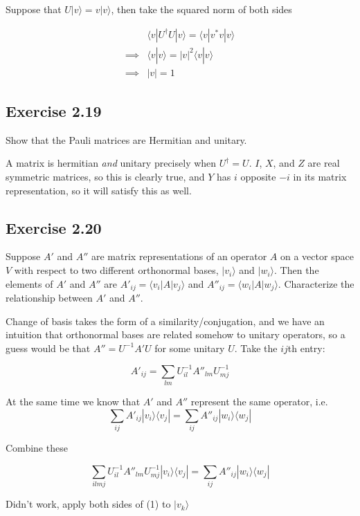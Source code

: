 \documentclass[]{article}
\newcommand{\bra}[1]{\langle #1 |}
\newcommand{\ket}[1]{| #1 \rangle}
\newcommand{\braket}[2]{\langle #1 | #2 \rangle}
\newcommand{\ord}[1]{\left| #1 \right|}
\begin{document}
Suppose that $U\ket{v} = v\ket{v}$, then take the squared norm of both sides

\begin{align*}
&\bra{v}U^\dagger U\ket{v} = \bra{v} v^*v \ket{v} \\
\implies &\braket{v}{v} = \ord{v}^2\braket{v}{v} \\
\implies &\ord{v} = 1
\end{align*}

\subsection{Exercise 2.19}
Show that the Pauli matrices are Hermitian and unitary.

A matrix is hermitian \textit{and} unitary precisely when $U^\dagger = U$. $I$, $X$, and $Z$ are real symmetric matrices, so this is clearly true, and $Y$ has $i$ opposite $-i$ in its matrix representation, so it will satisfy this as well.

\subsection{Exercise 2.20}

Suppose $A'$ and $A''$ are matrix representations of an operator $A$ on a vector space $V$ with respect to two different orthonormal bases, $\ket{v_i}$ and $\ket{w_i}$. Then the elements of $A'$ and $A''$ are $A'_{ij} = \bra{v_i}A\ket{v_j}$ and $A''_{ij} = \bra{w_i}A\ket{w_j}$. Characterize the relationship between $A'$ and $A''$.

Change of basis takes the form of a similarity/conjugation, and we have an intuition that orthonormal bases are related somehow to unitary operators, so a guess would be that $A'' = U^{-1}A'U$ for some unitary $U$. Take the $ij$th entry:

\[A'_{ij} = \sum_{lm} U^{-1}_{il}A''_{lm}U^{-1}_{mj}\]

At the same time we know that $A'$ and $A''$ represent the same operator, i.e.
\begin{equation}
\sum_{ij} A'_{ij}\ket{v_i}\bra{v_j} = \sum_{ij} A''_{ij}\ket{w_i}\bra{w_j}
\end{equation}

Combine these 

\[\sum_{ilmj} U^{-1}_{il}A''_{lm}U^{-1}_{mj}\ket{v_i}\bra{v_j} = \sum_{ij} A''_{ij}\ket{w_i}\bra{w_j}\]


Didn't work, apply both sides of (1) to $\ket{v_k}$
\end{document}

